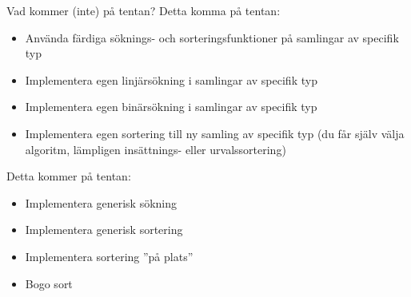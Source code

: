 \begin{Slide}{Vad kommer (inte) på tentan?}
Detta  komma på tentan:
\begin{itemize}
\item Använda färdiga söknings- och sorteringsfunktioner på samlingar av specifik typ
\item Implementera egen linjärsökning i samlingar av specifik typ
\item Implementera egen binärsökning i samlingar av specifik typ
\item Implementera egen sortering till ny samling av specifik typ (du får själv välja algoritm, lämpligen insättnings- eller urvalssortering)

\end{itemize}
Detta kommer  på tentan:
\begin{itemize}
\item Implementera generisk sökning 
\item Implementera generisk sortering
\item Implementera sortering ''på plats''
\item Bogo sort
\end{itemize}
\end{Slide}













